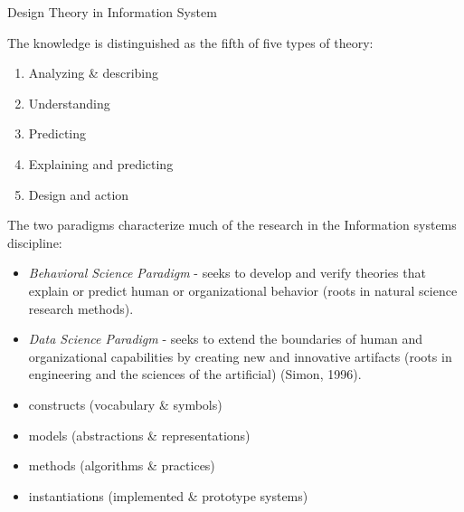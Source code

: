\documentclass[print]{nuthesis}
\providecommand{\tightlist}{%
  \setlength{\itemsep}{0pt}\setlength{\parskip}{0pt}}
\begin{document}
Design Theory in Information System

The knowledge is distinguished as the fifth of five types of theory:

\begin{enumerate}
\def\labelenumi{\arabic{enumi}.}
\tightlist
\item
  Analyzing \& describing
\item
  Understanding
\item
  Predicting
\item
  Explaining and predicting
\item
  Design and action
\end{enumerate}


The two paradigms characterize much of the research in the Information systems discipline:

\begin{itemize}
\tightlist
\item
  \emph{Behavioral Science Paradigm} - seeks to develop and verify theories that explain or predict human or organizational behavior (roots in natural science research methods).
\item
  \emph{Data Science Paradigm} - seeks to extend the boundaries of human and organizational capabilities by creating new and innovative artifacts (roots in engineering and the sciences of the artificial) (Simon, 1996).
\end{itemize}


\begin{itemize}
\tightlist
\item
  constructs (vocabulary \& symbols)
\item
  models (abstractions \& representations)
\item
  methods (algorithms \& practices)
\item
  instantiations (implemented \& prototype systems)
\end{itemize}

\end{document}
